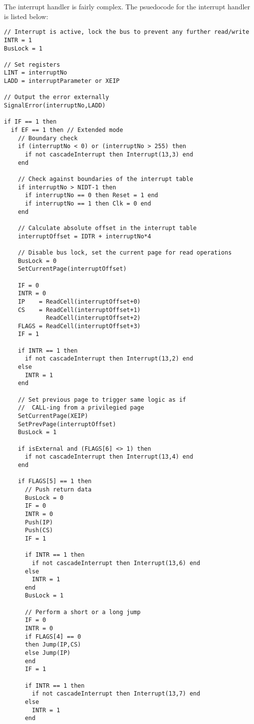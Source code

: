 The interrupt handler is fairly complex. The psuedocode for the interrupt handler is listed below:
\singlespacing
\begin{verbatim}
// Interrupt is active, lock the bus to prevent any further read/write
INTR = 1
BusLock = 1
  
// Set registers
LINT = interruptNo
LADD = interruptParameter or XEIP

// Output the error externally
SignalError(interruptNo,LADD)
  
if IF == 1 then
  if EF == 1 then // Extended mode
    // Boundary check
    if (interruptNo < 0) or (interruptNo > 255) then
      if not cascadeInterrupt then Interrupt(13,3) end
    end

    // Check against boundaries of the interrupt table
    if interruptNo > NIDT-1 then
      if interruptNo == 0 then Reset = 1 end
      if interruptNo == 1 then Clk = 0 end
    end

    // Calculate absolute offset in the interrupt table
    interruptOffset = IDTR + interruptNo*4

    // Disable bus lock, set the current page for read operations
    BusLock = 0
    SetCurrentPage(interruptOffset)

    IF = 0
    INTR = 0
    IP    = ReadCell(interruptOffset+0)
    CS    = ReadCell(interruptOffset+1)
            ReadCell(interruptOffset+2)
    FLAGS = ReadCell(interruptOffset+3)
    IF = 1
    
    if INTR == 1 then
      if not cascadeInterrupt then Interrupt(13,2) end
    else
      INTR = 1
    end
    
    // Set previous page to trigger same logic as if
    //  CALL-ing from a privilegied page
    SetCurrentPage(XEIP)
    SetPrevPage(interruptOffset)
    BusLock = 1

    if isExternal and (FLAGS[6] <> 1) then
      if not cascadeInterrupt then Interrupt(13,4) end
    end
    
    if FLAGS[5] == 1 then
      // Push return data
      BusLock = 0
      IF = 0
      INTR = 0
      Push(IP)
      Push(CS)
      IF = 1
      
      if INTR == 1 then
        if not cascadeInterrupt then Interrupt(13,6) end
      else
        INTR = 1
      end
      BusLock = 1

      // Perform a short or a long jump
      IF = 0
      INTR = 0
      if FLAGS[4] == 0
      then Jump(IP,CS)
      else Jump(IP)
      end
      IF = 1
      
      if INTR == 1 then
        if not cascadeInterrupt then Interrupt(13,7) end
      else
        INTR = 1
      end
      

\end{verbatim}
